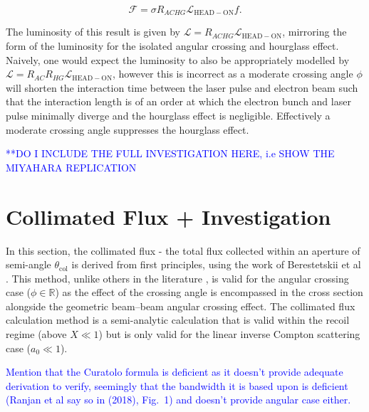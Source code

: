 \documentclass[../main.tex]{subfiles}
\begin{document}
\begin{equation}
\mathcal{F} = \sigma R_{ACHG}\mathcal{L}_{\mathrm{HEAD-ON}}f.
\label{eq:flux_angular_crossing_hourglass}
\end{equation}

The luminosity of this result is given by $\mathcal{L} = R_{ACHG}\mathcal{L}_{\mathrm{HEAD-ON}}$, mirroring the form of the luminosity for the isolated angular crossing and hourglass effect. Naively, one would expect the luminosity to also be appropriately modelled by $\mathcal{L} = R_{AC}R_{HG}\mathcal{L}_{\mathrm{HEAD-ON}}$, however this is incorrect as a moderate crossing angle $\phi$ will shorten the interaction time between the laser pulse and electron beam such that the interaction length is of an order at which the electron bunch and laser pulse minimally diverge and the hourglass effect is negligible. Effectively a moderate crossing angle suppresses the hourglass effect.   

\textcolor{blue}{**DO I INCLUDE THE FULL INVESTIGATION HERE, i.e SHOW THE MIYAHARA REPLICATION}

\section{Collimated Flux + Investigation}

In this section, the collimated flux - the total flux collected within an aperture of semi-angle $\theta_{\mathrm{col}}$ is derived from first principles, using the work of Berestetskii et al \cite{berestetskii1982quantum}. This method, unlike others in the literature \cite{curatolo2017analytical}, is valid for the angular crossing case ($\phi\in\mathbb{R}$) as the effect of the crossing angle is encompassed in the cross section alongside the geometric beam--beam angular crossing effect. The collimated flux calculation method is a semi-analytic calculation that is valid within the recoil regime (above $X\ll1$) but is only valid for the linear inverse Compton scattering case ($a_{0}\ll1$).

\textcolor{blue}{Mention that the Curatolo formula is deficient as it doesn't provide adequate derivation to verify, seemingly that the bandwidth it is based upon is deficient (Ranjan et al say so in (2018), Fig.~1) and doesn't provide angular case either.}
\end{document}
